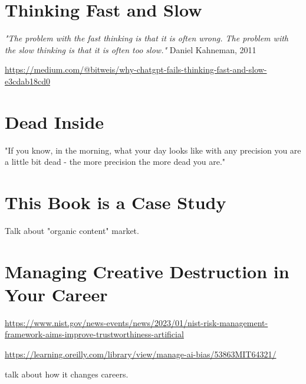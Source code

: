 \section{Thinking Fast and Slow}

\textit{"The problem with the fast thinking is that it is often wrong. The problem with the slow thinking is that it is often too slow."} Daniel Kahneman, 2011 \cite{Kahneman2011}

\url{https://medium.com/@bitweis/why-chatgpt-fails-thinking-fast-and-slow-e3cdab18cd0}

\section{Dead Inside}

"If you know, in the morning, what your day looks like with any precision you are a little bit dead - the more precision the more dead you are."

\section{This Book is a Case Study}

Talk about "organic content" market.

\section{Managing Creative Destruction in Your Career}

\url{https://www.nist.gov/news-events/news/2023/01/nist-risk-management-framework-aims-improve-trustworthiness-artificial}

\url{https://learning.oreilly.com/library/view/manage-ai-bias/53863MIT64321/}

talk about how it changes careers.
